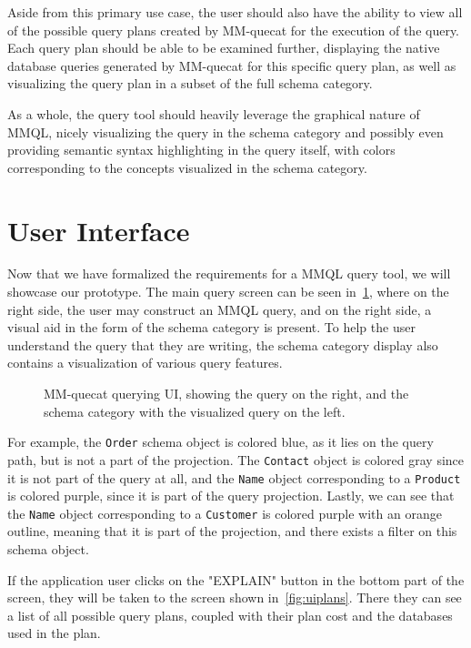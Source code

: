 Aside from this primary use case, the user should also have the ability to view all of the possible query plans created by MM-quecat for the execution of the query.
Each query plan should be able to be examined further, displaying the native database queries generated by MM-quecat for this specific query plan, as well as visualizing the query plan in a subset of the full schema category.

As a whole, the query tool should heavily leverage the graphical nature of MMQL, nicely visualizing the query in the schema category and possibly even providing semantic syntax highlighting in the query itself, with colors corresponding to the concepts visualized in the schema category.

\section{User Interface}

Now that we have formalized the requirements for a MMQL query tool, we will showcase our prototype.
The main query screen can be seen in~\cref{fig:uiquery}, where on the right side, the user may construct an MMQL query, and on the right side, a visual aid in the form of the schema category is present.
To help the user understand the query that they are writing, the schema category display also contains a visualization of various query features.

\begin{figure}[h]
\centering
{} 
\caption{MM-quecat querying UI, showing the query on the right, and the schema category with the visualized query on the left.}
\label{fig:uiquery}
\end{figure}

For example, the \texttt{Order} schema object is colored blue, as it lies on the query path, but is not a part of the projection.
The \texttt{Contact} object is colored gray since it is not part of the query at all, and the \texttt{Name} object corresponding to a \texttt{Product} is colored purple, since it is part of the query projection.
Lastly, we can see that the \texttt{Name} object corresponding to a \texttt{Customer} is colored purple with an orange outline, meaning that it is part of the projection, and there exists a filter on this schema object.

If the application user clicks on the "EXPLAIN" button in the bottom part of the screen, they will be taken to the screen shown in~\cref{fig:uiplans}.
There they can see a list of all possible query plans, coupled with their plan cost and the databases used in the plan.

